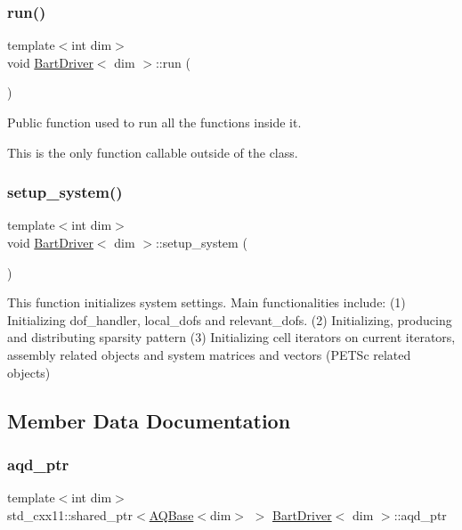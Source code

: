 \subsubsection{\texorpdfstring{run()}{run()}}
{\footnotesize\ttfamily template$<$int dim$>$ \\
void \hyperlink{class_bart_driver}{Bart\+Driver}$<$ dim $>$\+::run (\begin{DoxyParamCaption}{ }\end{DoxyParamCaption})}



Public function used to run all the functions inside it. 

This is the only function callable outside of the class. \mbox{\label{class_bart_driver_a54ac94a562fa8f5cdb13ba6c56965b9c}} 
\subsubsection{\texorpdfstring{setup\+\_\+system()}{setup\_system()}}
{\footnotesize\ttfamily template$<$int dim$>$ \\
void \hyperlink{class_bart_driver}{Bart\+Driver}$<$ dim $>$\+::setup\+\_\+system (\begin{DoxyParamCaption}{ }\end{DoxyParamCaption})\hspace{0.3cm}{\ttfamily [private]}}

This function initializes system settings. Main functionalities include\+: (1) Initializing dof\+\_\+handler, local\+\_\+dofs and relevant\+\_\+dofs. (2) Initializing, producing and distributing sparsity pattern (3) Initializing cell iterators on current iterators, assembly related objects and system matrices and vectors (P\+E\+T\+Sc related objects) 

\subsection{Member Data Documentation}
\mbox{\label{class_bart_driver_a818149e4acfe5a7108ef42938650ff11}} 
\subsubsection{\texorpdfstring{aqd\+\_\+ptr}{aqd\_ptr}}
{\footnotesize\ttfamily template$<$int dim$>$ \\
std\+\_\+cxx11\+::shared\+\_\+ptr$<$\hyperlink{class_a_q_base}{A\+Q\+Base}$<$dim$>$ $>$ \hyperlink{class_bart_driver}{Bart\+Driver}$<$ dim $>$\+::aqd\+\_\+ptr\hspace{0.3cm}{\ttfamily [private]}}



